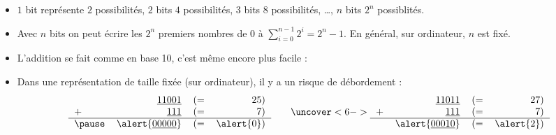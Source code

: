 \documentclass[xcolor=svgnames]{beamer}
\begin{document}
\begin{frame}
  \begin{itemize}
\item<1-> $1$ bit représente $2$ possibilités, $2$ bits $4$ possibilités,
  $3$ bits $8$ possibilités, \ldots, $n$ bits $2^n$ possiblités.
\item<2-> Avec $n$ bits on peut écrire les $2^{n}$ premiers nombres de
  $0$ à $\sum^{n - 1}_{i = 0} 2^i = 2^n - 1$. En général, sur ordinateur, $n$ est
  fixé.
\item<3-> L'addition se fait comme en base 10, c'est même encore plus facile :
\item<5-> Dans une représentation de taille fixée (sur ordinateur), il y a un risque de \alert{débordement} :
  \begin{gather*}
    \begin{tabular}{l r l r}
      &\binaire{11001} & (= & 25) \\
      + &\binaire{111} & (= &7)\\ \hline \pause
       & \alert{\binaire{00000}} & (= &\alert{0})
    \end{tabular}\qquad\uncover<6->{
   \begin{tabular}{l r l r}
      &\binaire{11011} & (= & 27) \\
      + &\binaire{111} & (= &7)\\ \hline 
       & \alert{\binaire{00010}} & (= &\alert{2})
    \end{tabular}}
  \end{gather*}
  \end{itemize}
\end{frame}
\end{document}
